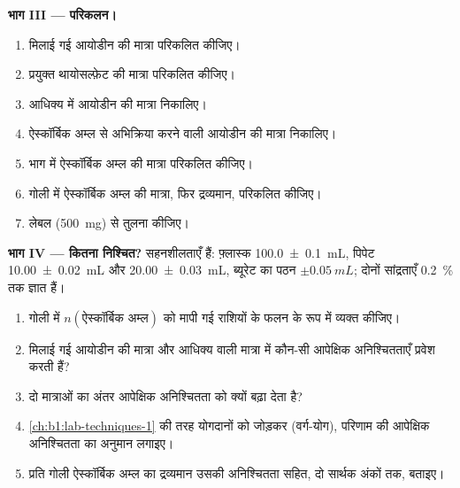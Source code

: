 \begin{problem}
\medskip
\noindent\textbf{भाग III --- परिकलन।}
\begin{enumerate}[resume]
  \item मिलाई गई आयोडीन की मात्रा परिकलित कीजिए।
  \item प्रयुक्त थायोसल्फ़ेट की मात्रा परिकलित कीजिए।
  \item आधिक्य में आयोडीन की मात्रा निकालिए।
  \item ऐस्कॉर्बिक अम्ल से अभिक्रिया करने वाली आयोडीन की मात्रा निकालिए।
  \item भाग में ऐस्कॉर्बिक अम्ल की मात्रा परिकलित कीजिए।
  \item गोली में ऐस्कॉर्बिक अम्ल की मात्रा, फिर द्रव्यमान, परिकलित
        कीजिए।
  \item लेबल (\qty{500}{mg}) से तुलना कीजिए।
\end{enumerate}

\medskip
\noindent\textbf{भाग IV --- कितना निश्चित?}
सहनशीलताएँ हैं: फ़्लास्क \qty{100.0 \pm 0.1}{mL}, पिपेट
\qty{10.00 \pm 0.02}{mL} और \qty{20.00 \pm 0.03}{mL}, ब्यूरेट का पठन
$\pm\qty{0.05}{mL}$; दोनों सांद्रताएँ \qty{0.2}{\percent} तक ज्ञात हैं।
\begin{enumerate}[resume]
  \item गोली में $n(\text{ऐस्कॉर्बिक अम्ल})$ को
        मापी गई राशियों के फलन के रूप में व्यक्त कीजिए।
  \item मिलाई गई आयोडीन की मात्रा और आधिक्य वाली मात्रा में कौन-सी आपेक्षिक
        अनिश्चितताएँ प्रवेश करती हैं?
  \item दो मात्राओं का अंतर आपेक्षिक
        अनिश्चितता को क्यों बढ़ा देता है?
  \item \cref{ch:b1:lab-techniques-1} की तरह योगदानों को जोड़कर
        (वर्ग-योग), परिणाम की आपेक्षिक अनिश्चितता का अनुमान लगाइए।
  \item प्रति गोली ऐस्कॉर्बिक अम्ल का द्रव्यमान उसकी अनिश्चितता सहित,
        दो सार्थक अंकों तक, बताइए।
\end{enumerate}
\end{problem}
